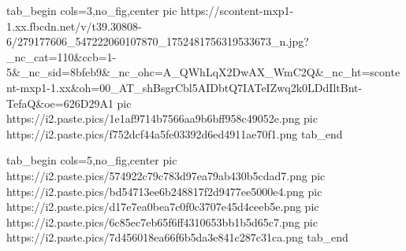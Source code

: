  
 
 
 
 

\ifcmt
  tab_begin cols=3,no_fig,center
     pic https://scontent-mxp1-1.xx.fbcdn.net/v/t39.30808-6/279177606_547222060107870_1752481756319533673_n.jpg?_nc_cat=110&ccb=1-5&_nc_sid=8bfeb9&_nc_ohc=A_QWhLqX2DwAX_WmC2Q&_nc_ht=scontent-mxp1-1.xx&oh=00_AT_shBsgrCbl5AIDbtQ7IATeIZwq2k0LDdIltBnt-TefaQ&oe=626D29A1
		 pic https://i2.paste.pics/1e1af9714b7566aa9b6bff958c49052e.png
		 pic https://i2.paste.pics/f752dcf44a5fe03392d6ed4911ae70f1.png
  tab_end
\fi

\ifcmt
  tab_begin cols=5,no_fig,center
     pic https://i2.paste.pics/574922c79c783d97ea79ab430b5cdad7.png
		 pic https://i2.paste.pics/bd54713ee6b248817f2d9477ee5000e4.png
		 pic https://i2.paste.pics/d17e7ea0bea7c0f0c3707e45d4ceeb5e.png
		 pic https://i2.paste.pics/6c85ec7eb65f6ff4310653bb1b5d65c7.png
		 pic https://i2.paste.pics/7d456018ea66f6b5da3e841c287c31ca.png
  tab_end
\fi
